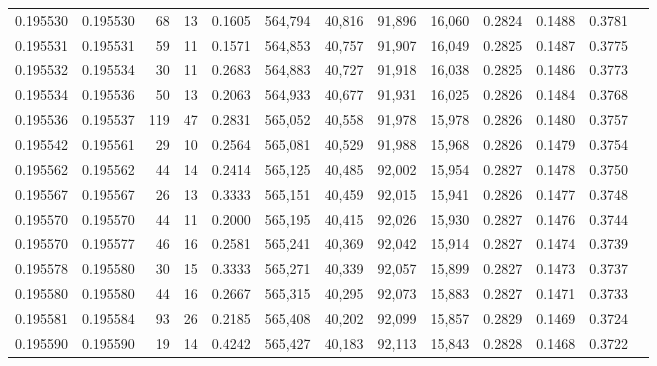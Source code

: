 \begin{tabular}{rrrrrrrrrrrrr}
0.195530 & 0.195530 &    68 &  13 &                                     0.1605 & 564,794 &  40,816 &  91,896 &  16,060 & 0.2824 & 0.1488 & 0.3781 \\
0.195531 & 0.195531 &    59 &  11 &                                     0.1571 & 564,853 &  40,757 &  91,907 &  16,049 & 0.2825 & 0.1487 & 0.3775 \\
0.195532 & 0.195534 &    30 &  11 &                                     0.2683 & 564,883 &  40,727 &  91,918 &  16,038 & 0.2825 & 0.1486 & 0.3773 \\
0.195534 & 0.195536 &    50 &  13 &                                     0.2063 & 564,933 &  40,677 &  91,931 &  16,025 & 0.2826 & 0.1484 & 0.3768 \\
0.195536 & 0.195537 &   119 &  47 &                                     0.2831 & 565,052 &  40,558 &  91,978 &  15,978 & 0.2826 & 0.1480 & 0.3757 \\
0.195542 & 0.195561 &    29 &  10 &                                     0.2564 & 565,081 &  40,529 &  91,988 &  15,968 & 0.2826 & 0.1479 & 0.3754 \\
0.195562 & 0.195562 &    44 &  14 &                                     0.2414 & 565,125 &  40,485 &  92,002 &  15,954 & 0.2827 & 0.1478 & 0.3750 \\
0.195567 & 0.195567 &    26 &  13 &                                     0.3333 & 565,151 &  40,459 &  92,015 &  15,941 & 0.2826 & 0.1477 & 0.3748 \\
0.195570 & 0.195570 &    44 &  11 &                                     0.2000 & 565,195 &  40,415 &  92,026 &  15,930 & 0.2827 & 0.1476 & 0.3744 \\
0.195570 & 0.195577 &    46 &  16 &                                     0.2581 & 565,241 &  40,369 &  92,042 &  15,914 & 0.2827 & 0.1474 & 0.3739 \\
0.195578 & 0.195580 &    30 &  15 &                                     0.3333 & 565,271 &  40,339 &  92,057 &  15,899 & 0.2827 & 0.1473 & 0.3737 \\
0.195580 & 0.195580 &    44 &  16 &                                     0.2667 & 565,315 &  40,295 &  92,073 &  15,883 & 0.2827 & 0.1471 & 0.3733 \\
0.195581 & 0.195584 &    93 &  26 &                                     0.2185 & 565,408 &  40,202 &  92,099 &  15,857 & 0.2829 & 0.1469 & 0.3724 \\
0.195590 & 0.195590 &    19 &  14 &                                     0.4242 & 565,427 &  40,183 &  92,113 &  15,843 & 0.2828 & 0.1468 & 0.3722 \\

\end{tabular}
